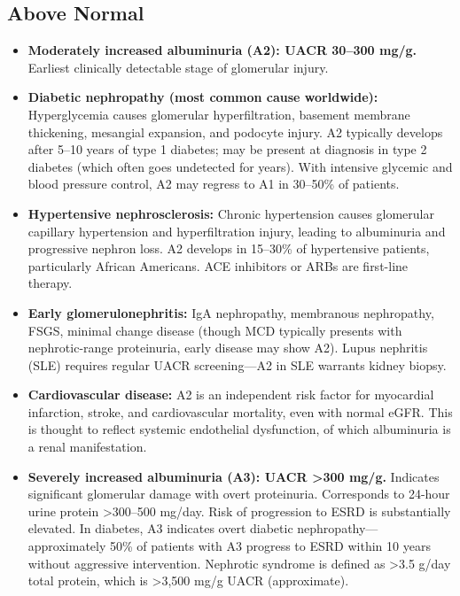 \subsection*{Above Normal}
\begin{itemize}
  \item \textbf{Moderately increased albuminuria (A2): UACR 30--300 mg/g.} Earliest clinically detectable stage of glomerular injury.
  \item \textbf{Diabetic nephropathy (most common cause worldwide):} Hyperglycemia causes glomerular hyperfiltration, basement membrane thickening, mesangial expansion, and podocyte injury. A2 typically develops after 5--10 years of type 1 diabetes; may be present at diagnosis in type 2 diabetes (which often goes undetected for years). With intensive glycemic and blood pressure control, A2 may regress to A1 in 30--50\% of patients.
  \item \textbf{Hypertensive nephrosclerosis:} Chronic hypertension causes glomerular capillary hypertension and hyperfiltration injury, leading to albuminuria and progressive nephron loss. A2 develops in 15--30\% of hypertensive patients, particularly African Americans. ACE inhibitors or ARBs are first-line therapy.
  \item \textbf{Early glomerulonephritis:} IgA nephropathy, membranous nephropathy, FSGS, minimal change disease (though MCD typically presents with nephrotic-range proteinuria, early disease may show A2). Lupus nephritis (SLE) requires regular UACR screening---A2 in SLE warrants kidney biopsy.
  \item \textbf{Cardiovascular disease:} A2 is an independent risk factor for myocardial infarction, stroke, and cardiovascular mortality, even with normal eGFR. This is thought to reflect systemic endothelial dysfunction, of which albuminuria is a renal manifestation.
  \item \textbf{Severely increased albuminuria (A3): UACR >300 mg/g.} Indicates significant glomerular damage with overt proteinuria. Corresponds to 24-hour urine protein >300--500 mg/day. Risk of progression to ESRD is substantially elevated. In diabetes, A3 indicates overt diabetic nephropathy---approximately 50\% of patients with A3 progress to ESRD within 10 years without aggressive intervention. Nephrotic syndrome is defined as >3.5 g/day total protein, which is >3,500 mg/g UACR (approximate).
\end{itemize}

